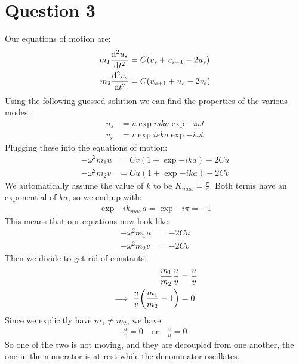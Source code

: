 \documentclass[12pt]{article}
\begin{document}
\section*{Question 3}
Our equations of motion are:
\begin{align*}
  m_1\dv[2]{u_s}{t}&=C\qty(v_s+v_{s-1}-2u_s)\\
  m_2\dv[2]{v_s}{t}&=C\qty(u_{s+1}+u_{s}-2v_s)\\
\end{align*}
Using the following guessed solution we can find the properties of the various modes:
\begin{align*}
  u_s&=u\exp{iska}\exp{-i\omega t}\\
  v_s&=v\exp{iska}\exp{-i\omega t}
\end{align*}
Plugging these into the equations of motion:
\begin{align*}
  -\omega^2m_1u&=Cv(1+\exp{-ika})-2Cu\\
  -\omega^2m_2v&=Cu(1+\exp{-ika})-2Cv
\end{align*}
We automatically assume the value of $k$ to be $K_{max}=\frac{\pi}{a}$. Both terms have an exponential of $ka$, so we end up with:
\begin{align*}
  \exp{-ik_{max}a}=\exp{-i\pi}=-1
\end{align*}
This means that our equations now look like:
\begin{align*}
  -\omega^2m_1u&=-2Cu\\
  -\omega^2m_2v&=-2Cv
\end{align*}
Then we divide to get rid of constants:
\begin{align*}
  \frac{m_1}{m_2}\frac{u}{v}&=\frac{u}{v}\\
  \implies\frac{u}{v}\qty(\frac{m_1}{m_2}-1)&=0
\end{align*}
Since we explicitly have $m_1\neq m_2$, we have:
\begin{align*}
  \frac{u}{v}=0\quad\text{or}\quad\frac{v}{u}=0
\end{align*}
So one of the two is not moving, and they are decoupled from one another, the one in the numerator is at rest while the denominator oscillates. 
\end{document}
